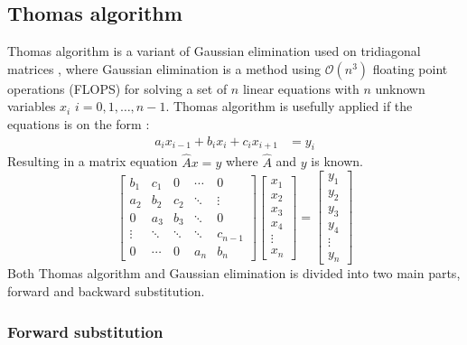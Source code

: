 \documentclass[twoside,twocolumn]{article}
\begin{document}
\subsection{Thomas algorithm}
Thomas algorithm is a variant of Gaussian elimination used on tridiagonal matrices \cite{compfys}, where Gaussian elimination is a method using $\mathcal{O}(n^3)$ floating point operations (FLOPS) for solving a set of $n$ linear equations with $n$ unknown variables $x_i$ $i=0,1,\ldots,n-1$. Thomas algorithm is usefully applied if the equations is on the form :
\begin{align*}
a_{i}x_{i-1}+b_{i}x_i+c_{i}x_{i+1}&=y_i
\end{align*}
Resulting in a matrix equation $\hat{A}x= y$ where $\hat{A}$ and $y$ is known.
\begin{equation*}
\begin{bmatrix}
b_1&c_1&0&\cdots &0\\
a_2&b_2&c_2& \ddots & \vdots\\
0&a_3&b_3&\ddots&0\\
\vdots&\ddots&\ddots&\ddots&c_{n-1}\\
0&\cdots&0&a_n&b_n
\end{bmatrix}
\begin{bmatrix}
x_1\\x_2\\x_3\\x_4\\\vdots\\x_{n}
\end{bmatrix}=
\begin{bmatrix}
y_1\\y_2\\y_3\\y_4\\\vdots\\y_{n}
\end{bmatrix} 
\end{equation*}
Both Thomas algorithm and Gaussian elimination is divided into two main parts, forward and backward substitution.

\subsubsection{Forward substitution}
\end{document}
